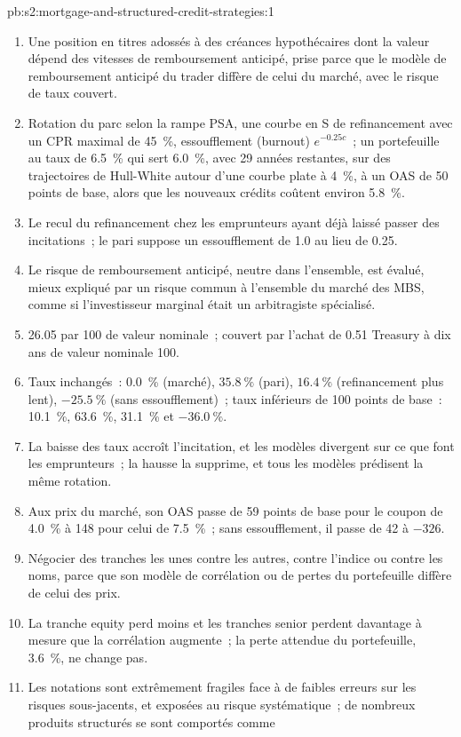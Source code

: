 \begin{solution}{pb:s2:mortgage-and-structured-credit-strategies:1}
\begin{enumerate}
\item Une position en titres adossés à des créances hypothécaires dont la valeur dépend des vitesses de remboursement anticipé, prise parce que le modèle de remboursement anticipé du trader diffère de celui du
marché, avec le risque de taux couvert.
\item Rotation du parc selon la rampe PSA, une courbe en S de refinancement avec un CPR maximal de 45~\%, essoufflement (burnout) $e^{-0.25c}$~; un portefeuille au taux de 6.5~\% qui sert 6.0~\%, avec 29
années restantes, sur des trajectoires de Hull-White autour d'une courbe plate à 4~\%, à un OAS de 50 points de base, alors que les nouveaux crédits coûtent environ 5.8~\%.
\item Le recul du refinancement chez les emprunteurs ayant déjà laissé passer des incitations~; le pari suppose un essoufflement de 1.0 au lieu de 0.25.
\item Le risque de remboursement anticipé, neutre dans l'ensemble, est évalué, mieux expliqué par un risque commun à l'ensemble du marché des MBS, comme si l'investisseur marginal était un
arbitragiste spécialisé.
\item 26.05 par 100 de valeur nominale~; couvert par l'achat de 0.51 Treasury à dix ans de valeur nominale 100.
\item Taux inchangés~: 0.0~\% (marché), $35.8~\%$ (pari), $16.4~\%$ (refinancement plus lent), $-25.5~\%$ (sans essoufflement)~; taux inférieurs de 100 points de base~:
10.1~\%, 63.6~\%, 31.1~\% et $-36.0~\%$.
\item La baisse des taux accroît l'incitation, et les modèles divergent sur ce que font les emprunteurs~; la hausse la supprime, et tous les modèles prédisent la
même rotation.
\item Aux prix du marché, son OAS passe de 59 points de base pour le coupon de 4.0~\% à 148 pour celui de 7.5~\%~; sans essoufflement, il passe de 42 à
$-326$.
\item Négocier des tranches les unes contre les autres, contre l'indice ou contre les noms, parce que son modèle de corrélation ou de pertes du portefeuille diffère de celui des prix.
\item La tranche equity perd moins et les tranches senior perdent davantage à mesure que la corrélation augmente~; la perte attendue du portefeuille, 3.6~\%, ne change pas.
\item Les notations sont extrêmement fragiles face à de faibles erreurs sur les risques sous-jacents, et exposées au risque systématique~; de nombreux produits structurés se sont comportés comme

\end{enumerate}
\end{solution}
